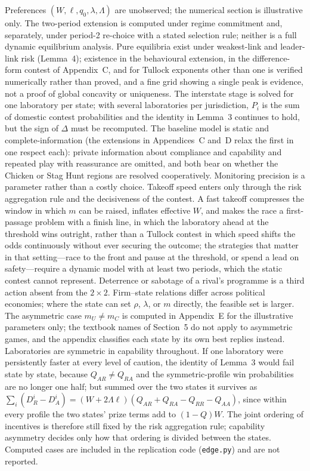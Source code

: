 \documentclass[11pt]{article}
\theoremstyle{plain}
\theoremstyle{definition}
\theoremstyle{remark}
\newcommand{\Lam}{\Lambda}
\newcommand{\Delt}{\Delta}
\begin{document}
Preferences $(W,\ell,q_0,\lambda,\Lam)$ are unobserved; the numerical section is illustrative only. The two-period extension is computed under regime commitment and, separately, under period-2 re-choice with a stated selection rule; neither is a full dynamic equilibrium analysis. Pure equilibria exist under weakest-link and leader-link risk (Lemma~4); existence in the behavioural extension, in the difference-form contest of Appendix~C, and for Tullock exponents other than one is verified numerically rather than proved, and a fine grid showing a single peak is evidence, not a proof of global concavity or uniqueness. The interstate stage is solved for one laboratory per state; with several laboratories per jurisdiction, $P_i$ is the sum of domestic contest probabilities and the identity in Lemma~3 continues to hold, but the sign of $\Delt$ must be recomputed. The baseline model is static and complete-information (the extensions in Appendices~C and~D relax the first in one respect each): private information about compliance and capability \citep{fearon1995,emery2024} and repeated play with reassurance \citep{kydd2005} are omitted, and both bear on whether the Chicken or Stag Hunt regions are resolved cooperatively. Monitoring precision is a parameter rather than a costly choice. Takeoff speed enters only through the risk aggregation rule and the decisiveness of the contest. A fast takeoff compresses the window in which $m$ can be raised, inflates effective $W$, and makes the race a first-passage problem with a finish line, in which the laboratory ahead at the threshold wins outright, rather than a Tullock contest in which speed shifts the odds continuously without ever securing the outcome; the strategies that matter in that setting---race to the front and pause at the threshold, or spend a lead on safety---require a dynamic model with at least two periods, which the static contest cannot represent. Deterrence or sabotage of a rival's programme \citep{hendrycks2025} is a third action absent from the $2\times2$. Firm--state relations differ across political economies; where the state can set $\rho$, $\lambda$, or $m$ directly, the feasible set is larger. The asymmetric case $m_U\neq m_C$ is computed in Appendix~E for the illustrative parameters only; the textbook names of Section~5 do not apply to asymmetric games, and the appendix classifies each state by its own best replies instead. Laboratories are symmetric in capability throughout. If one laboratory were persistently faster at every level of caution, the identity of Lemma~3 would fail state by state, because $Q_{AR}\neq Q_{RA}$ and the symmetric-profile win probabilities are no longer one half; but summed over the two states it survives as $\sum_i(D^i_R-D^i_A)=(W+2\Lam\ell)(Q_{AR}+Q_{RA}-Q_{RR}-Q_{AA})$, since within every profile the two states' prize terms add to $(1-Q)W$. The joint ordering of incentives is therefore still fixed by the risk aggregation rule; capability asymmetry decides only how that ordering is divided between the states. Computed cases are included in the replication code (\texttt{edge.py}) and are not reported.
\end{document}
